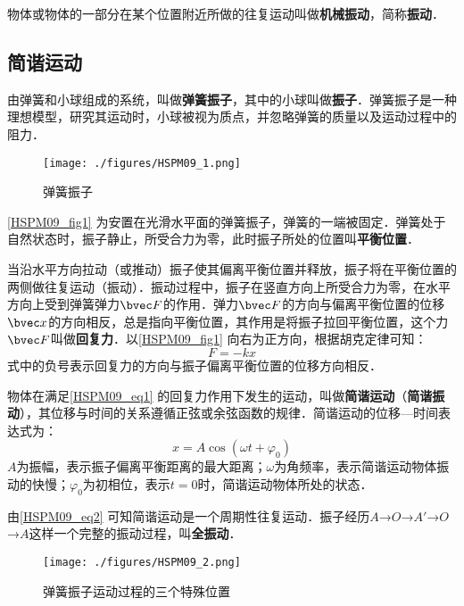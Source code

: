 
\begin{issues}
\issueDraft
\issueTODO
\end{issues}

物体或物体的一部分在某个位置附近所做的往复运动叫做\textbf{机械振动}，简称\textbf{振动}．

\subsection{简谐运动}

由弹簧和小球组成的系统，叫做\textbf{弹簧振子}，其中的小球叫做\textbf{振子}．弹簧振子是一种理想模型，研究其运动时，小球被视为质点，并忽略弹簧的质量以及运动过程中的阻力．

\begin{figure}[ht]
\centering
\texttt{[image: ./figures/HSPM09\_1.png]}
\caption{弹簧振子} \label{HSPM09_fig1}
\end{figure}

\autoref{HSPM09_fig1} 为安置在光滑水平面的弹簧振子，弹簧的一端被固定．弹簧处于自然状态时，振子静止，所受合力为零，此时振子所处的位置叫\textbf{平衡位置}．

当沿水平方向拉动（或推动）振子使其偏离平衡位置并释放，振子将在平衡位置的两侧做往复运动（振动）．振动过程中，振子在竖直方向上所受合力为零，在水平方向上受到弹簧弹力$\bvec F$的作用．弹力$\bvec F$的方向与偏离平衡位置的位移$\bvec x$的方向相反，总是指向平衡位置，其作用是将振子拉回平衡位置，这个力$\bvec F$叫做\textbf{回复力}．以\autoref{HSPM09_fig1} 向右为正方向，根据胡克定律可知：
\begin{equation}\label{HSPM09_eq1}
F=-kx
\end{equation}
式中的负号表示回复力的方向与振子偏离平衡位置的位移方向相反．

物体在满足\autoref{HSPM09_eq1} 的回复力作用下发生的运动，叫做\textbf{简谐运动}（\textbf{简谐振动}），其位移与时间的关系遵循正弦或余弦函数的规律．简谐运动的位移—时间表达式为：
\begin{equation}\label{HSPM09_eq2}
x=A\cos(\omega t + \varphi_0)
\end{equation}
$A$为振幅，表示振子偏离平衡距离的最大距离；$\omega$为角频率，表示简谐运动物体振动的快慢；$\varphi_0$为初相位，表示$t=0$时，简谐运动物体所处的状态．

由\autoref{HSPM09_eq2} 可知简谐运动是一个周期性往复运动．振子经历$A$→$O$→$A'$→$O$→$A$这样一个完整的振动过程，叫\textbf{全振动}．

\begin{figure}[ht]
\centering
\texttt{[image: ./figures/HSPM09\_2.png]}
\caption{弹簧振子运动过程的三个特殊位置} \label{HSPM09_fig2}
\end{figure}

